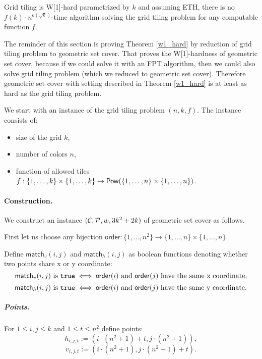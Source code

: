 \begin{tw}
\label{grid_tiling_w1_hard}
\textbf{\cite{marx_grid_tiling}}
Grid tiling is W[1]-hard parametrized by $k$ and
assuming ETH, there is no $f(k)\cdot n^{o(\sqrt{k})}$-time
algorithm solving the grid tiling problem
for any computable function $f$.
\end{tw}

The reminder of this section is proving Theorem \ref{w1_hard}
by reduction of grid tiling problem to geometric set cover.
That proves the W[1]-hardness of geometric set cover,
because if we could solve it with an FPT algorithm,
then we could also solve grid tiling problem
(which we reduced to geometric set cover).
Therefore geometric set cover with setting
described in Theorem \ref{w1_hard}
is at least as hard as the grid tiling problem.

We start with an instance of the grid tiling problem $(n, k, f)$.
The instance consists of:
\begin{itemize}
\item size of the grid $k$,
\item number of colors $n$,
\item function of allowed tiles
$f : \{1, \ldots, k\} \times \{1, \ldots, k\} \rightarrow \mathsf{Pow}(\{1, \ldots, n\} \times \{1, \ldots, n\})$.
\end{itemize}

\paragraph{Construction.}
\newcommand{\order}{\mathsf{order}}
\newcommand{\matchv}{\mathsf{match}_v}
\newcommand{\matchh}{\mathsf{match}_h}
\newcommand{\instanceSetCover}{(\points, \sets, w, 3k^2+2k)}
We construct an instance $\instanceSetCover$ of geometric set cover as follows.

First let us choose any bijection
$\order : \{1, \ldots, n^2\} \rightarrow \{1, \ldots, n\} \times \{1, \ldots, n\}$.


Define $\matchv(i, j)$ and $\matchh(i, j)$
as boolean functions denoting whether two points share x or y coordinate:
$$\matchv(i, j) \text{ is } \true \iff
\order(i) \text{ and } \order(j) \text{ have the same x coordinate,}$$
$$\matchh(i, j) \text{ is } \true \iff
\order(i) \text{ and } \order(j) \text{ have the same y coordinate.}$$


\subparagraph{Points.}

For $1 \le i,j \le k$ and $1 \le t \le n^2$ define points:
	$$h_{i, j, t} := (i \cdot (n^2+1) + t, j \cdot (n^2+1)),$$
	$$v_{i, j, t} := (i \cdot (n^2+1), j \cdot (n^2+1) + t).$$
	
